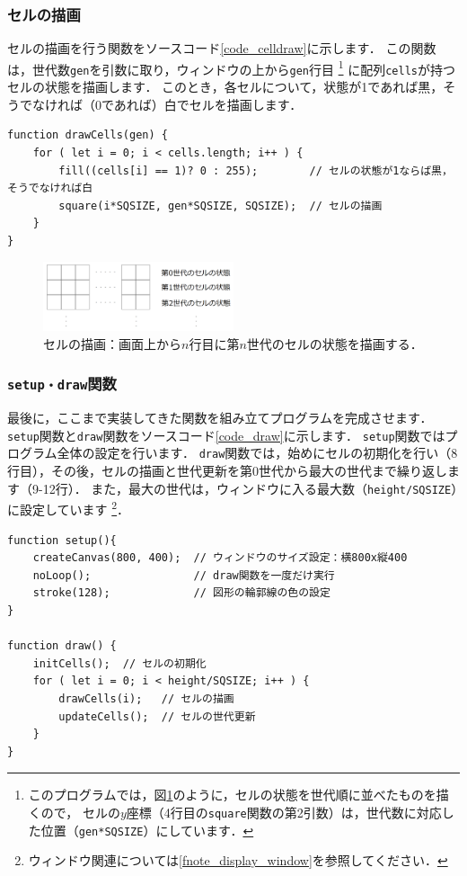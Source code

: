 \documentclass[dvipdfmx]{jsarticle}
\theoremstyle{definition}
\begin{document}
\subsubsection{セルの描画}  \label{subsubsec_cell_draw}
セルの描画を行う関数をソースコード\ref{code_celldraw}に示します．
この関数は，世代数\verb|gen|を引数に取り，ウィンドウの上から\verb|gen|行目
\footnote{
    このプログラムでは，図\ref{pic_eca_draw}のように，セルの状態を世代順に並べたものを描くので，
    セルの$y$座標（4行目の\texttt{square}関数の第2引数）は，世代数に対応した位置（\texttt{gen*SQSIZE}）にしています．
}
に配列\verb|cells|が持つセルの状態を描画します．
このとき，各セルについて，状態が1であれば黒，そうでなければ（0であれば）白でセルを描画します．
%
\begin{lstlisting}[caption=セル描画関数, label=code_celldraw]
function drawCells(gen) {
    for ( let i = 0; i < cells.length; i++ ) {
        fill((cells[i] == 1)? 0 : 255);        // セルの状態が1ならば黒，そうでなければ白
        square(i*SQSIZE, gen*SQSIZE, SQSIZE);  // セルの描画
    }
}
\end{lstlisting}
%
\begin{figure}[H]
    \centering
    \includegraphics[width=0.5\textwidth]{figure/eca/eca_draw.png}
    \caption{セルの描画：画面上から$n$行目に第$n$世代のセルの状態を描画する．}
    \label{pic_eca_draw}
\end{figure}

\subsubsection{\texttt{setup・draw}関数}  \label{subsubsec_draw_func}
最後に，ここまで実装してきた関数を組み立てプログラムを完成させます．
\verb|setup|関数と\verb|draw|関数をソースコード\ref{code_draw}に示します．
\verb|setup|関数ではプログラム全体の設定を行います．
\verb|draw|関数では，始めにセルの初期化を行い（8行目），その後，セルの描画と世代更新を第0世代から最大の世代まで繰り返します（9-12行）．
また，最大の世代は，ウィンドウに入る最大数（\verb|height/SQSIZE|）に設定しています
\footnote{
    ウィンドウ関連については\ref{fnote_display_window}を参照してください．
}．
%
\begin{lstlisting}[caption=\texttt{draw}関数, label=code_draw]
function setup(){
    createCanvas(800, 400);  // ウィンドウのサイズ設定：横800x縦400
    noLoop();                // draw関数を一度だけ実行
    stroke(128);             // 図形の輪郭線の色の設定
}

function draw() {
    initCells();  // セルの初期化
    for ( let i = 0; i < height/SQSIZE; i++ ) {
        drawCells(i);   // セルの描画
        updateCells();  // セルの世代更新
    }
}
\end{lstlisting}
\end{document}
